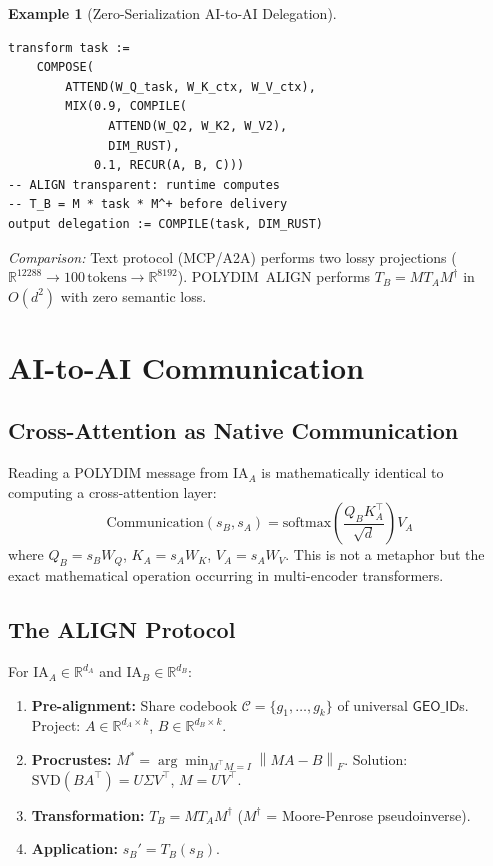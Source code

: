 \documentclass[10pt,twocolumn]{article}
\theoremstyle{plain}
\theoremstyle{definition}
\newtheorem{example}[theorem]{Example}
\theoremstyle{remark}
\newcommand{\RR}{\mathbb{R}}
\newcommand{\GeoID}{\mathsf{GEO\_ID}}
\newcommand{\norm}[1]{\left\|#1\right\|}
\begin{document}
\begin{example}[Zero-Serialization AI-to-AI Delegation]
\begin{lstlisting}[language=polydim,caption={IA\_A delegates a task to IA\_B via the ALIGN protocol---no text, no JSON.}]
transform task :=
    COMPOSE(
        ATTEND(W_Q_task, W_K_ctx, W_V_ctx),
        MIX(0.9, COMPILE(
              ATTEND(W_Q2, W_K2, W_V2),
              DIM_RUST),
            0.1, RECUR(A, B, C)))
-- ALIGN transparent: runtime computes
-- T_B = M * task * M^+ before delivery
output delegation := COMPILE(task, DIM_RUST)
\end{lstlisting}
\emph{Comparison:} Text protocol (MCP/A2A) performs two lossy projections
($\RR^{12288} \to 100\,\text{tokens} \to \RR^{8192}$). POLYDIM~ALIGN performs
$T_B = M T_A M^\dagger$ in $O(d^2)$ with zero semantic loss.
\end{example}

\section{AI-to-AI Communication}
\label{sec:aitai}

\subsection{Cross-Attention as Native Communication}

Reading a POLYDIM message from $\mathrm{IA}_A$ is mathematically identical to
computing a cross-attention layer:
\[
  \mathrm{Communication}(s_B, s_A)
  = \mathrm{softmax}\!\left(\frac{Q_B K_A^\top}{\sqrt{d}}\right) V_A
\]
where $Q_B = s_B W_Q$, $K_A = s_A W_K$, $V_A = s_A W_V$. This is not a
metaphor but the exact mathematical operation occurring in multi-encoder
transformers.

\subsection{The ALIGN Protocol}

For $\mathrm{IA}_A \in \RR^{d_A}$ and $\mathrm{IA}_B \in \RR^{d_B}$:
\begin{enumerate}[label=\arabic*.,leftmargin=*]
\item \textbf{Pre-alignment:} Share codebook $\mathcal{C} = \{g_1,\ldots,g_k\}$
  of universal $\GeoID$s. Project: $A \in \RR^{d_A \times k}$, $B \in
  \RR^{d_B \times k}$.
\item \textbf{Procrustes:} $M^* = \arg\min_{M^\top M = I} \norm{MA - B}_F$.
  Solution: $\mathrm{SVD}(BA^\top) = U\Sigma V^\top$, $M = UV^\top$.
\item \textbf{Transformation:} $T_B = M T_A M^\dagger$ ($M^\dagger$ =
  Moore-Penrose pseudoinverse).
\item \textbf{Application:} $s_B' = T_B(s_B)$.
\end{enumerate}
\end{document}
